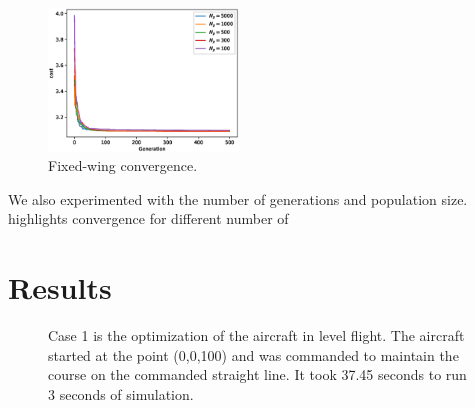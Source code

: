 \documentclass[letterpaper, 10 pt, conference]{ieeeconf}  %
\begin{document}
\begin{figure}[htbp]
	\centering
	\includegraphics[width=0.45\textwidth]{figures/fixedwing_convergence.eps}
	\caption{Fixed-wing convergence.}
	\label{fig:fw_convergence}
\end{figure}


We also experimented with the number of generations and population size.  highlights convergence for different number of 


\section{Results}


\begin{figure}[htbp]
	\centering
	\qquad
	\caption{Case 1 is the optimization of the aircraft in level flight. The aircraft started at the point (0,0,100) and was commanded to maintain the course on the commanded straight line. It took 37.45 seconds to run 3 seconds of simulation.}
	\label{fig:fw_level}
\end{figure}
\end{document}
